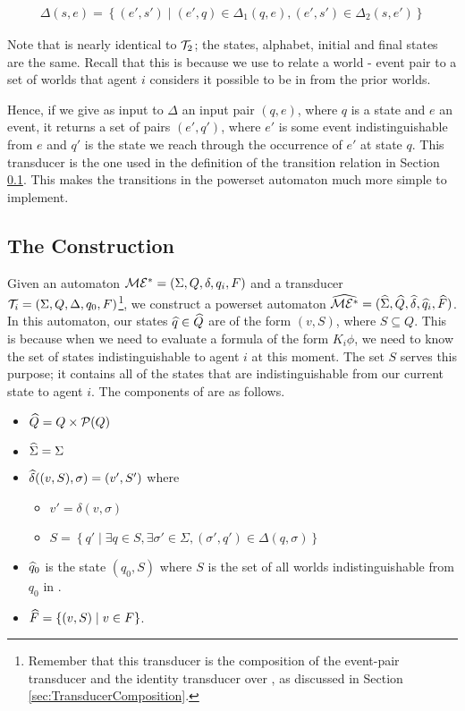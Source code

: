 \documentclass[ %
                    author={Leo Poulson},
                supervisor={Dr. Steven Ramsay},
                    degree={BSc},
                     title={Epistemic Planning for the Dynamic Gossip problem},
                  subtitle={},
                      year={2019} ]{dissertation}
\begin{document}
\begin{align*}
  \Delta(s, e) = \left\{ (e', s') \mid (e', q) \in \Delta_1(q, e), (e', s') \in \Delta_2(s, e') \right\} 
\end{align*}

Note that  is nearly identical to $\mathcal{T}_2$; the states, alphabet,
initial and final states are the same. Recall that this is because we use
 to relate a world - event pair to a set of worlds that agent $i$
considers it possible to be in from the prior worlds. 

Hence, if we give as input to $\Delta$ an input pair $(q, e)$, where $q$ is a
state and $e$ an event, it returns a set of pairs $(e', q')$, where $e'$ is some
event indistinguishable from $e$ and $q'$ is the state we reach through the
occurrence of $e'$ at state $q$. This transducer is the one used in the
definition of the transition relation in Section \ref{sec:Powerset}. This makes
the transitions in the powerset automaton much more simple to implement.

\subsection{The Construction}
\label{sec:Powerset}

Given an automaton $\mathcal{ME^\ast} = (\Sigma, Q, \delta, q_i, F)$ and a transducer
$\mathcal{T}_i = (\Sigma, Q, \Delta, q_0, F)$\footnote{Remember that this transducer
  is the composition of the event-pair transducer and the identity transducer
  over \mestar, as discussed in Section \ref{sec:TransducerComposition}.}, we construct a powerset
automaton $\widehat{\mathcal{ME^\ast}} = (\widehat{\Sigma}, \widehat{Q}, \widehat{\delta}, \widehat{q}_i,
\widehat{F})$. In this automaton, our states $\widehat{q} \in \widehat{Q}$ are of the form $(v,
S)$, where $S \subseteq Q$. This is because when we need to evaluate a formula
of the form $K_i\phi$, we need to know the set of states indistinguishable
to agent $i$ at this moment. The set $S$ serves this purpose; it contains all of
the states that are indistinguishable from our current state to agent $i$. The
components of \mestar are as follows. 

\begin{itemize}
\item $\widehat{Q} = Q \times \mathcal{P}(Q)$
\item $\widehat{\Sigma} = \Sigma$ 
\item $\widehat{\delta}((v, S), \sigma) = (v', S')$ where
  \begin{itemize}
  \item $v' =  \delta(v, \sigma)$
  \item $S = \left\{q' \mid \exists q \in S, \exists \sigma' \in \Sigma,
      (\sigma', q') \in \Delta(q, \sigma) \right\}$
  \end{itemize}
\item $\widehat{q}_0$ is the state $(q_0, S)$ where $S$ is the set of all worlds
  indistinguishable from $q_0$ in \mestar.
\item $\widehat{F} = \left\{ (v, S) \mid v \in F \right\}$.
\end{itemize}
\end{document}
